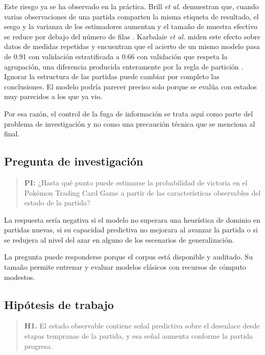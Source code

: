 Este riesgo ya se ha observado en la práctica. Brill \textit{et al.} demuestran
que, cuando varias observaciones de una partida comparten la misma etiqueta
de resultado, el
sesgo y la varianza de los estimadores aumentan y el tamaño de muestra
efectivo se reduce por debajo del número de filas
\cite{brill_winprob_2026}. Karbalaie \textit{et al.} miden este efecto sobre
datos de medidas repetidas y encuentran que el acierto de un mismo modelo
pasa de 0.91 con validación estratificada a 0.66 con validación que respeta la agrupación, una
diferencia producida enteramente por la regla de partición
\cite{karbalaie_participantaware_2026}. Ignorar la estructura de las partidas
puede cambiar por completo las conclusiones. El modelo podría parecer preciso
solo porque se evalúa con estados muy parecidos a los que ya vio.

Por esa razón, el control de la fuga de información se trata aquí como parte
del problema de investigación y no como una precaución técnica que se
menciona al final.

\subsection{Pregunta de investigación}
\label{subsec:pregunta}

\begin{quote}
\textbf{PI:} ¿Hasta qué punto puede estimarse la probabilidad de victoria en
el Pok\'emon Trading Card Game a partir de las características observables
del estado de la partida?
\end{quote}

La respuesta sería negativa si el modelo no superara una heurística de
dominio en partidas nuevas, si su capacidad predictiva no mejorara al avanzar
la partida o si se redujera al nivel del azar en alguno de los escenarios de
generalización.

La pregunta puede responderse porque el corpus está disponible y auditado. Su
tamaño permite entrenar y evaluar modelos clásicos con recursos de cómputo
modestos.

\subsection{Hipótesis de trabajo}
\label{subsec:hipotesis}

\begin{quote}
\textbf{H1.} El estado observable contiene señal predictiva sobre el
desenlace desde etapas tempranas de la partida, y esa señal aumenta conforme
la partida progresa.
\end{quote}

